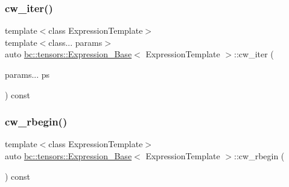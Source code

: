 \mbox{\label{classbc_1_1tensors_1_1Expression__Base_abfdc8d0379441d705afd5747a26a031d}} 
\subsubsection{\texorpdfstring{cw\+\_\+iter()}{cw\_iter()}\hspace{0.1cm}{\footnotesize\ttfamily [2/2]}}
{\footnotesize\ttfamily template$<$class Expression\+Template$>$ \\
template$<$class... params$>$ \\
auto \hyperlink{classbc_1_1tensors_1_1Expression__Base}{bc\+::tensors\+::\+Expression\+\_\+\+Base}$<$ Expression\+Template $>$\+::cw\+\_\+iter (\begin{DoxyParamCaption}\item[{params...}]{ps }\end{DoxyParamCaption}) const\hspace{0.3cm}{\ttfamily [inline]}}

\mbox{\label{classbc_1_1tensors_1_1Expression__Base_a82c194b3f8c9e934caf0ac5e5380042a}} 
\subsubsection{\texorpdfstring{cw\+\_\+rbegin()}{cw\_rbegin()}\hspace{0.1cm}{\footnotesize\ttfamily [1/2]}}
{\footnotesize\ttfamily template$<$class Expression\+Template$>$ \\
auto \hyperlink{classbc_1_1tensors_1_1Expression__Base}{bc\+::tensors\+::\+Expression\+\_\+\+Base}$<$ Expression\+Template $>$\+::cw\+\_\+rbegin (\begin{DoxyParamCaption}{ }\end{DoxyParamCaption}) const\hspace{0.3cm}{\ttfamily [inline]}}

